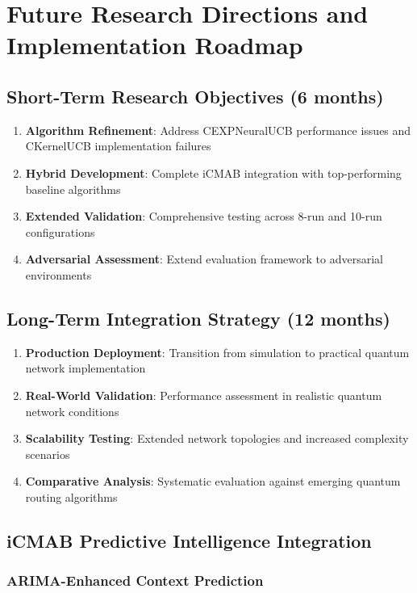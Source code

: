 \documentclass[12pt,a4paper]{article}
\begin{document}
\section{Future Research Directions and Implementation Roadmap}

\subsection{Short-Term Research Objectives (6 months)}

\begin{enumerate}
\item \textbf{Algorithm Refinement}: Address CEXPNeuralUCB performance issues and CKernelUCB implementation failures
\item \textbf{Hybrid Development}: Complete iCMAB integration with top-performing baseline algorithms
\item \textbf{Extended Validation}: Comprehensive testing across 8-run and 10-run configurations
\item \textbf{Adversarial Assessment}: Extend evaluation framework to adversarial environments
\end{enumerate}

\subsection{Long-Term Integration Strategy (12 months)}

\begin{enumerate}
\item \textbf{Production Deployment}: Transition from simulation to practical quantum network implementation
\item \textbf{Real-World Validation}: Performance assessment in realistic quantum network conditions
\item \textbf{Scalability Testing}: Extended network topologies and increased complexity scenarios
\item \textbf{Comparative Analysis}: Systematic evaluation against emerging quantum routing algorithms
\end{enumerate}

\subsection{iCMAB Predictive Intelligence Integration}

\subsubsection{ARIMA-Enhanced Context Prediction}
\end{document}
